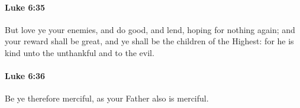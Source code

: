 		\paragraph{Luke 6:35} %
			\label{LUKE-6-35}

			But love ye your enemies, and do good, and lend, hoping for nothing again; and your reward shall be great, and ye shall be the children of the Highest: for he is kind unto the unthankful and to the evil.

			\begin{framed}
			\scriptsize
				\begin{compactdesc}
					\item[SBLG] 
				\end{compactdesc}
			\end{framed}

		\paragraph{Luke 6:36} %
			\label{LUKE-6-36}

			Be ye therefore merciful, as your Father also is merciful.

